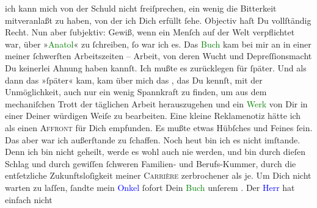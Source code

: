                ich kann mich von der Schuld nicht freiſprechen, ein wenig die Bitterkeit
               mitveranlaßt zu haben, von der ich Dich erfüllt ſehe. Objectiv haſt Du vollſtändig
               Recht. Nun aber ſubjektiv: Gewiß, wenn ein Menſch auf der Welt verpflichtet war, über
                  »\textcolor{green}{Anatol}{}\ledrightnote{\textcolor{green}{Anatol}}« zu ſchreiben, ſo war ich es. Das \textcolor{green}{Buch}{} kam bei mir an in einer
               meiner ſchwerſten Arbeitszeiten – Arbeit, von deren Wucht und Depreſ{\pb}ſionsmacht Du keinerlei Ahnung haben kannſt. Ich
               mußte es zurücklegen für ſpäter. Und als dann das »ſpäter« kam, kam über mich das
                  \label{K_L02709-44v}\label{K_L02709-44h}, das Du
               kennſt, mit der Unmöglichkeit, auch nur ein wenig Spannkraft zu finden, um aus dem
               mechaniſchen Trott der täglichen Arbeit herauszugehen und \strikeout{\textcolor{gray}{×}} ein \textcolor{green}{Werk}{} von Dir in
               einer Deiner würdigen Weiſe zu bearbeiten. Eine kleine Reklamenotiz hätte ich als
               einen \textsc{Affront} für Dich empfunden. Es mußte etwas Hübſches
               und Feines {\pb}ſein. Das aber war ich außerſtande zu
               ſchaffen. Noch heut bin ich es nicht imſtande. Denn
               ich bin nicht geheilt, werde es wohl auch nie werden, und bin durch dieſen Schlag und
               durch gewiſſen ſchweren Familien- und Berufs-Kummer, durch die entſetzliche
               Zukunftsloſigkeit meiner \textsc{Carrière} zerbrochener als je. Um
               Dich nicht warten zu laſſen, ſandte mein \textcolor{blue}{Onkel}{} ſofort Dein \textcolor{green}{Buch}{} unſerem \label{K_L02709-5v}\label{K_L02709-5h}. Der \textcolor{blue}{Herr}{} hat einfach nicht
